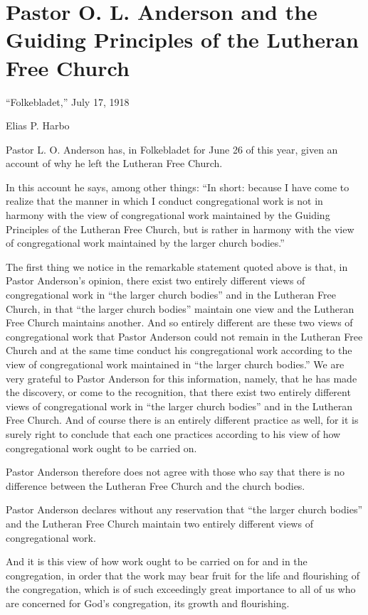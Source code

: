 
\section{Pastor O. L. Anderson and the Guiding Principles of the Lutheran Free Church}

“Folkebladet,” July 17, 1918

Elias P. Harbo

Pastor L. O. Anderson has, in Folkebladet for June 26 of this year, given an account of why he left the Lutheran Free Church.

In this account he says, among other things: “In short: because I have come to realize that the manner in which I conduct congregational work is not in harmony with the view of congregational work maintained by the Guiding Principles of the Lutheran Free Church, but is rather in harmony with the view of congregational work maintained by the larger church bodies.”

The first thing we notice in the remarkable statement quoted above is that, in Pastor Anderson’s opinion, there exist two entirely different views of congregational work in “the larger church bodies” and in the Lutheran Free Church, in that “the larger church bodies” maintain one view and the Lutheran Free Church maintains another. And so entirely different are these two views of congregational work that Pastor Anderson could not remain in the Lutheran Free Church and at the same time conduct his congregational work according to the view of congregational work maintained in “the larger church bodies.” We are very grateful to Pastor Anderson for this information, namely, that he has made the discovery, or come to the recognition, that there exist two entirely different views of congregational work in “the larger church bodies” and in the Lutheran Free Church. And of course there is an entirely different practice as well, for it is surely right to conclude that each one practices according to his view of how congregational work ought to be carried on.

Pastor Anderson therefore does not agree with those who say that there is no difference between the Lutheran Free Church and the church bodies.

Pastor Anderson declares without any reservation that “the larger church bodies” and the Lutheran Free Church maintain two entirely different views of congregational work.

And it is this view of how work ought to be carried on for and in the congregation, in order that the work may bear fruit for the life and flourishing of the congregation, which is of such exceedingly great importance to all of us who are concerned for God’s congregation, its growth and flourishing.

